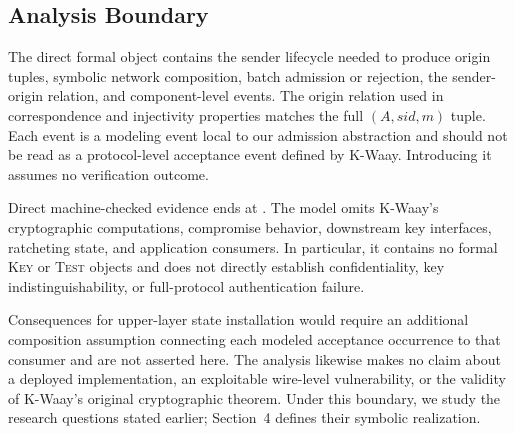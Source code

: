 \subsection{Analysis Boundary}

The direct formal object contains the sender lifecycle needed to produce
origin tuples, symbolic network composition, batch admission or rejection,
the sender-origin relation, and component-level \receiveraccept events. The
origin relation used in correspondence and injectivity properties matches the
full \((A,\mathit{sid},m)\) tuple. Each \receiveraccept event is a modeling
event local to our admission abstraction and should not be read as a
protocol-level acceptance event defined by K-Waay. Introducing it assumes no
verification outcome.

Direct machine-checked evidence ends at \receiveraccept. The model omits
K-Waay's cryptographic computations, compromise behavior, downstream key
interfaces, ratcheting state, and application consumers. In particular, it
contains no formal \textsc{Key} or \textsc{Test} objects and does not directly
establish confidentiality, key indistinguishability, or full-protocol
authentication failure.

Consequences for upper-layer state installation would require an additional
composition assumption connecting each modeled acceptance occurrence to that
consumer and are not asserted here. The analysis likewise makes no claim about
a deployed implementation, an exploitable wire-level vulnerability, or the
validity of K-Waay's original cryptographic theorem. Under this boundary, we
study the research questions stated earlier; Section~4 defines their symbolic
realization.
